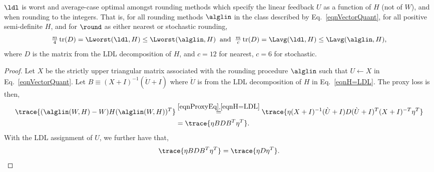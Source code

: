 \begin{theoremrep}\label{thmLDLopt}
$\ldl$ is worst and average-case optimal amongst rounding methods which specify the linear feedback $U$ as a function of $H$ (not of $W$), and when rounding to the integers.
That is, for all rounding methods $\alglin$ in the class described by Eq.~\eqref{eqnVectorQuant}, for all positive semi-definite $H$, and for $\round$ as either nearest or stochastic rounding,
\[
    \textstyle
    \frac{m}{4} \operatorname{tr}(D) = \Lworst(\ldl, H) \leq \Lworst(\alglin, H)
    \;\;\text{and}\;\;
    \frac{m}{c} \operatorname{tr}(D) = \Lavg(\ldl, H) \leq \Lavg(\alglin, H),
\]
where $D$ is the matrix from the LDL decomposition of $H$, and $c=12$ for nearest, $c=6$ for stochastic.
\end{theoremrep}
\begin{proof}
Let $X$ be the strictly upper triangular matrix associated with the rounding procedure $\alglin$ such that $U \gets X$ in Eq.~\eqref{eqnVectorQuant}.
Let $B \equiv (X + I)^{-1} (\grave U + I)$ where $\grave U$ is from the LDL decomposition of $H$ in Eq.~\eqref{eqnH=LDL}.
The proxy loss is then, 
\begin{align}
    \trace{ (\alglin(W, H) - W) H (\alglin(W, H))^T }
    &\stackrel{\eqref{eqnProxyEq},\eqref{eqnH=LDL}}{=}
    \trace{ \eta (X + I)^{-1} (\grave U + I) D (\grave U + I)^T (X + I)^{-T} \eta^T }\nonumber\\
    &= 
    \trace{ \eta B D B^T \eta^T }.
    \label{eqnThm1proofa} 
\end{align}
With the LDL assignment of $U$, we further have that,
\begin{equation}
    \label{eqnThm1proofb} 
    \trace{ \eta B D B^T \eta^T }
    =
    \trace{ \eta D \eta^T }.
\end{equation}


\end{proof}
